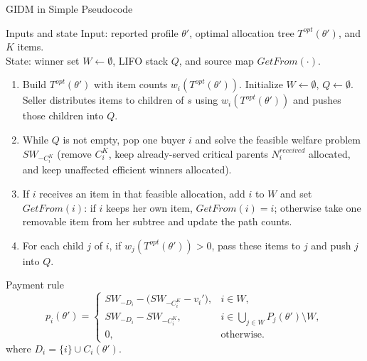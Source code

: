 \documentclass[10pt,aspectratio=169]{beamer}
\begin{document}
\begin{frame}{GIDM in Simple Pseudocode}
\scriptsize
\begin{block}{Inputs and state}
Input: reported profile $\theta'$, optimal allocation tree $T^{opt}(\theta')$, and $K$ items.\\
State: winner set $W\leftarrow\emptyset$, LIFO stack $Q$, and source map $GetFrom(\cdot)$.
\end{block}

\begin{enumerate}
  \item Build $T^{opt}(\theta')$ with item counts $w_i(T^{opt}(\theta'))$. Initialize $W\leftarrow\emptyset$, $Q\leftarrow\emptyset$. Seller distributes items to children of $s$ using $w_i(T^{opt}(\theta'))$ and pushes those children into $Q$.
  \item While $Q$ is not empty, pop one buyer $i$ and solve the feasible welfare problem $SW_{-C_i^K}$ (remove $C_i^K$, keep already-served critical parents $N_i^{received}$ allocated, and keep unaffected efficient winners allocated).
  \item If $i$ receives an item in that feasible allocation, add $i$ to $W$ and set $GetFrom(i)$: if $i$ keeps her own item, $GetFrom(i)=i$; otherwise take one removable item from her subtree and update the path counts.
  \item For each child $j$ of $i$, if $w_j(T^{opt}(\theta'))>0$, pass these items to $j$ and push $j$ into $Q$.
\end{enumerate}

\begin{block}{Payment rule}
{\small
\[
p_i(\theta')=
\begin{cases}
SW_{-D_i}-\big(SW_{-C_i^K}-v_i'\big), & i\in W,\\
SW_{-D_i}-SW_{-C_i^K}, & i\in \bigcup_{j\in W}P_j(\theta')\setminus W,\\
0, & \text{otherwise.}
\end{cases}
\]
where $D_i=\{i\}\cup C_i(\theta')$.
}
\end{block}
\end{frame}
\end{document}
